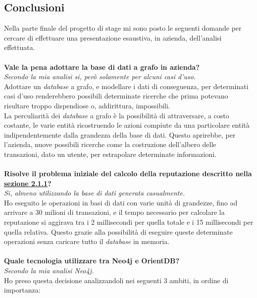 \subsection{Conclusioni}
Nella parte finale del progetto di stage mi sono posto le seguenti domande per cercare di effettuare una presentazione esaustiva, in azienda, dell'analisi effettuata.\\
\\
\textbf{Vale la pena adottare la base di dati a grafo in azienda?}\\
\textit{Secondo la mia analisi si, però solamente per alcuni casi d'uso.}\\
Adottare un \textit{database} a grafo, e modellare i dati di conseguenza, per determinati casi d'uso renderebbero possibili determinate ricerche che prima potevano risultare troppo dispendiose o, addirittura, impossibili.\\
La perculiarità dei \textit{database} a grafo è la possibilità di attraversare, a costo costante, le varie entità ricostruendo le azioni compiute da una particolare entità indipendentemente dalla grandezza della base di dati. Questo aprirebbe, per l'azienda, nuove possibili ricerche come la costruzione dell'albero delle transazioni, dato un utente, per estrapolare determinate informazioni.\\
\\
\textbf{Risolve il problema iniziale del calcolo della reputazione descritto nella \hyperlink{sec:prob}{sezione 2.1.1}?}\\
\textit{Si, almeno utilizzando la base di dati generata casualmente.}\\
Ho eseguito le operazioni in basi di dati con varie unità di grandezze, fino ad arrivare a 30 milioni di transazioni, e il tempo necessario per calcolare la reputazione si aggirava tra i 2 millisecondi per quella totale e i 15 millisecondi per quella relativa. Questo grazie alla possibilità di eseguire queste determinate operazioni senza caricare tutto il \textit{database} in memoria.\\
\\
\textbf{Quale tecnologia utilizzare tra Neo4j e OrientDB?}\\
\textit{Secondo la mia analisi Neo4j.}\\
Ho preso questa decisione analizzandoli nei seguenti 3 ambiti, in ordine di importanza:

